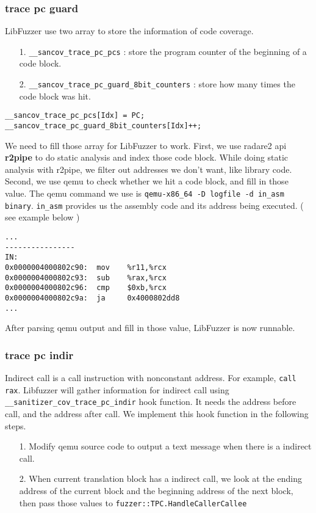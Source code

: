 \subsubsection{trace pc guard}

LibFuzzer use two array to store the information of code coverage.
\begin{enumerate}
    \item [1.] \texttt{\_\_sancov\_trace\_pc\_pcs} : store the program counter of the beginning of a code block.
    \item [2.] \texttt{\_\_sancov\_trace\_pc\_guard\_8bit\_counters} : store how many times the code block was hit.
\end{enumerate}

\begin{lstlisting}
__sancov_trace_pc_pcs[Idx] = PC;
__sancov_trace_pc_guard_8bit_counters[Idx]++;
\end{lstlisting}

We need to fill those array for LibFuzzer to work.
First, we use radare2 api \textbf{r2pipe} to do static analysis and index those code block.
While doing static analysis with r2pipe, we filter out addresses we don't want, like library code.
Second, we use qemu to check whether we hit a code block, and fill in those value.
The qemu command we use is \texttt{qemu-x86\_64 -D logfile -d in\_asm binary}.
\texttt{in\_asm} provides us the assembly code and its address being executed. ( see example below )

\begin{lstlisting}
...
----------------
IN:
0x0000004000802c90:  mov    %r11,%rcx
0x0000004000802c93:  sub    %rax,%rcx
0x0000004000802c96:  cmp    $0xb,%rcx
0x0000004000802c9a:  ja     0x4000802dd8
...
\end{lstlisting}

After parsing qemu output and fill in those value, LibFuzzer is now runnable.

\subsubsection{trace pc indir}

Indirect call is a call instruction with nonconstant address.
For example, \texttt{call rax}.
Libfuzzer will gather information for indirect call using \texttt{\_\_sanitizer\_cov\_trace\_pc\_indir} hook function.
It needs the address before call, and the address after call.
We implement this hook function in the following steps.

\begin{enumerate}
    \item [1.] Modify qemu source code to output a text message when there is a indirect call.
    \item [2.] When current translation block has a indirect call, we look at the ending address of the current block and the beginning address of the next block, then pass those values to \texttt{fuzzer::TPC.HandleCallerCallee}
\end{enumerate}
